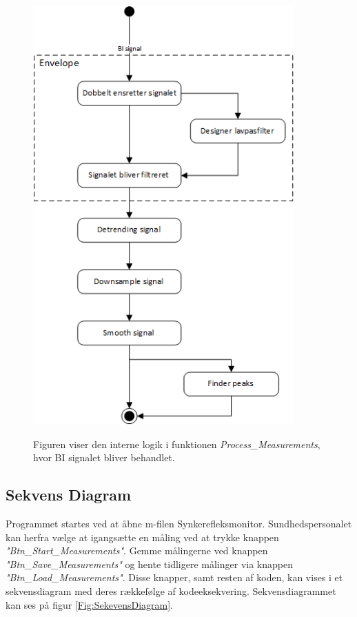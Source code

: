 \begin{figure}[H]
\centering
{\includegraphics[width=10cm]
{Figure/designSWenvelope}}
\caption{Figuren viser den interne logik i funktionen \textit{Process\_Measurements}, hvor BI signalet bliver behandlet. }
\label{fig:designSWenvelope}
\end{figure}


\subsection{Sekvens Diagram}

Programmet startes ved at åbne m-filen Synkerefleksmonitor. Sundhedspersonalet kan herfra vælge at igangsætte en måling ved at trykke knappen \textit{"Btn\_Start\_Measurements"}. Gemme målingerne ved knappen \textit{"Btn\_Save\_Measurements"} og hente tidligere målinger via knappen \textit{"Btn\_Load\_Measurements"}. Disse knapper, samt resten af koden, kan vises i et sekvensdiagram med deres rækkefølge af kodeeksekvering. Sekvensdiagrammet kan ses på figur \ref{Fig:SekevensDiagram}.


